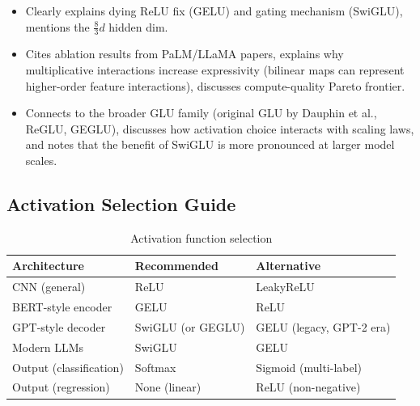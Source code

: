\begin{interviewq}

\goodgreat
\begin{itemize}
    \item {} Clearly explains dying ReLU fix (GELU) and gating mechanism (SwiGLU), mentions the $\frac{8}{3}d$ hidden dim.
    \item {} Cites ablation results from PaLM/LLaMA papers, explains why multiplicative interactions increase expressivity (bilinear maps can represent higher-order feature interactions), discusses compute-quality Pareto frontier.
    \item {} Connects to the broader GLU family (original GLU by Dauphin et al., ReGLU, GEGLU), discusses how activation choice interacts with scaling laws, and notes that the benefit of SwiGLU is more pronounced at larger model scales.
\end{itemize}

\end{interviewq}

\subsection{Activation Selection Guide}

\begin{table}[H]
\centering
\caption{Activation function selection}
\begin{tabularx}{\textwidth}{lXX}
\toprule
\textbf{Architecture} & \textbf{Recommended} & \textbf{Alternative} \\
\midrule
CNN (general) & ReLU & LeakyReLU \\
BERT-style encoder & GELU & ReLU \\
GPT-style decoder & SwiGLU (or GEGLU) & GELU (legacy, GPT-2 era) \\
Modern LLMs & SwiGLU & GELU \\
Output (classification) & Softmax & Sigmoid (multi-label) \\
Output (regression) & None (linear) & ReLU (non-negative) \\
\bottomrule
\end{tabularx}
\end{table}

